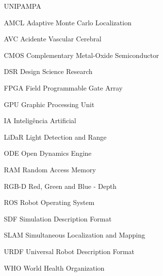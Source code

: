 \documentclass[tcc,baec]{unipampa}
\begin{document}
%
\begin{listofabbrv}{UNIPAMPA}
       \item[AMCL]  Adaptive Monte Carlo Localization
        \item[AVC]     Acidente Vascular Cerebral
        \item[CMOS]    Complementary Metal-Oxide Semiconductor
        \item[DSR]      Design Science Research
        \item[FPGA]    Field Programmable Gate Array
        \item[GPU]     Graphic Processing Unit
        \item[IA]      Inteligência Artificial
        \item[LiDaR]   Light Detection and Range
        \item[ODE]     Open Dynamics Engine
        \item[RAM]      Random Access Memory
        \item[RGB-D]   Red, Green and Blue - Depth
        \item[ROS]     Robot Operating System
        \item[SDF]      Simulation Description Format
        \item[SLAM]    Simultaneous Localization and Mapping
        \item[URDF]  Universal Robot Description Format
        \item[WHO]     World Health Organization
\end{listofabbrv}


% 
%

\tableofcontents

% 
%
\end{document}

